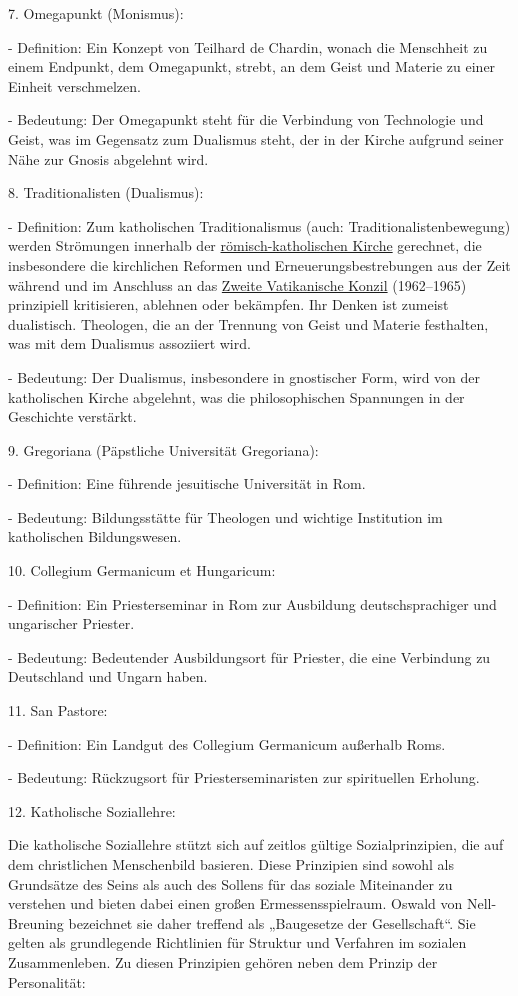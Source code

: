 \documentclass[
]{article}
\begin{document}
7. Omegapunkt (Monismus):

- Definition: Ein Konzept von Teilhard de Chardin, wonach die Menschheit
zu einem Endpunkt, dem Omegapunkt, strebt, an dem Geist und Materie zu
einer Einheit verschmelzen.

- Bedeutung: Der Omegapunkt steht für die Verbindung von Technologie und
Geist, was im Gegensatz zum Dualismus steht, der in der Kirche aufgrund
seiner Nähe zur Gnosis abgelehnt wird.

8. Traditionalisten (Dualismus):

- Definition: Zum katholischen Traditionalismus (auch:
Traditionalistenbewegung) werden Strömungen innerhalb der
\href{https://de.wikipedia.org/wiki/R\%C3\%B6misch-katholische_Kirche}{römisch-katholischen
Kirche} gerechnet, die insbesondere die kirchlichen Reformen und
Erneuerungsbestrebungen aus der Zeit während und im Anschluss an das
\href{https://de.wikipedia.org/wiki/Zweites_Vatikanisches_Konzil}{Zweite
Vatikanische Konzil} (1962--1965) prinzipiell kritisieren, ablehnen oder
bekämpfen. Ihr Denken ist zumeist dualistisch. Theologen, die an der
Trennung von Geist und Materie festhalten, was mit dem Dualismus
assoziiert wird.

- Bedeutung: Der Dualismus, insbesondere in gnostischer Form, wird von
der katholischen Kirche abgelehnt, was die philosophischen Spannungen in
der Geschichte verstärkt.

9. Gregoriana (Päpstliche Universität Gregoriana):

- Definition: Eine führende jesuitische Universität in Rom.

- Bedeutung: Bildungsstätte für Theologen und wichtige Institution im
katholischen Bildungswesen.

10. Collegium Germanicum et Hungaricum:

- Definition: Ein Priesterseminar in Rom zur Ausbildung
deutschsprachiger und ungarischer Priester.

- Bedeutung: Bedeutender Ausbildungsort für Priester, die eine
Verbindung zu Deutschland und Ungarn haben.

11. San Pastore:

- Definition: Ein Landgut des Collegium Germanicum außerhalb Roms.

- Bedeutung: Rückzugsort für Priesterseminaristen zur spirituellen
Erholung.

12. Katholische Soziallehre:

Die katholische Soziallehre stützt sich auf zeitlos gültige
Sozialprinzipien, die auf dem christlichen Menschenbild basieren. Diese
Prinzipien sind sowohl als Grundsätze des Seins als auch des Sollens für
das soziale Miteinander zu verstehen und bieten dabei einen großen
Ermessensspielraum. Oswald von Nell-Breuning bezeichnet sie daher
treffend als „Baugesetze der Gesellschaft``. Sie gelten als grundlegende
Richtlinien für Struktur und Verfahren im sozialen Zusammenleben. Zu
diesen Prinzipien gehören neben dem Prinzip der Personalität:
\end{document}
